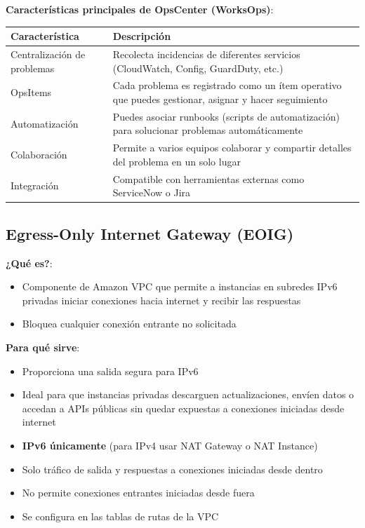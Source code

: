 \documentclass[12pt,a4paper]{report}
\begin{document}
\textbf{Características principales de OpsCenter (WorksOps)}:

\begin{center}
\begin{longtable}{|p{4cm}|p{9cm}|}
\hline
\cellcolor{awsblue!20}\textbf{Característica} & \cellcolor{awsblue!20}\textbf{Descripción} \\
\hline
Centralización de problemas & Recolecta incidencias de diferentes servicios (CloudWatch, Config, GuardDuty, etc.) \\
\hline
OpsItems & Cada problema es registrado como un ítem operativo que puedes gestionar, asignar y hacer seguimiento \\
\hline
Automatización & Puedes asociar runbooks (scripts de automatización) para solucionar problemas automáticamente \\
\hline
Colaboración & Permite a varios equipos colaborar y compartir detalles del problema en un solo lugar \\
\hline
Integración & Compatible con herramientas externas como ServiceNow o Jira \\
\hline
\end{longtable}
\end{center}

\subsection{Egress-Only Internet Gateway (EOIG)}

\textbf{¿Qué es?}:
\begin{itemize}
    \item Componente de Amazon VPC que permite a instancias en subredes IPv6 privadas iniciar conexiones hacia internet y recibir las respuestas
    \item Bloquea cualquier conexión entrante no solicitada
\end{itemize}

\textbf{Para qué sirve}:
\begin{itemize}
    \item Proporciona una salida segura para IPv6
    \item Ideal para que instancias privadas descarguen actualizaciones, envíen datos o accedan a APIs públicas sin quedar expuestas a conexiones iniciadas desde internet
\end{itemize}

\begin{warningbox}
\begin{itemize}
    \item \textbf{IPv6 únicamente} (para IPv4 usar NAT Gateway o NAT Instance)
    \item Solo tráfico de salida y respuestas a conexiones iniciadas desde dentro
    \item No permite conexiones entrantes iniciadas desde fuera
    \item Se configura en las tablas de rutas de la VPC
\end{itemize}
\end{warningbox}
\end{document}
